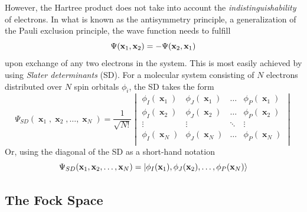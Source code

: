 However, the Hartree product does not take into account the \emph{indistinguishability} of electrons. In what is known as the antisymmetry principle, a generalization of the Pauli exclusion principle, the wave function needs to fulfill 
\begin{equation}
\Psi(\mathbf{x}_1,\mathbf{x}_2) = - \Psi(\mathbf{x}_2,\mathbf{x}_1) 
\end{equation}
\noindent upon exchange of any two electrons in the system. This is most easily achieved by using \emph{Slater determinants} (SD). For a molecular system consisting of $N$ electrons distributed over $N$ spin orbitals $\phi_i$, the SD takes the form
\begin{equation}
\Psi_{SD}(\mbfx_1, \mbfx_2, \ldots, \mbfx_N) = \frac{1}{\sqrt{N!}}
\begin{vmatrix}
\phi_I(\mbfx_1) & \phi_J(\mbfx_1) & \ldots & \phi_P(\mbfx_1) \\
\phi_I(\mbfx_2) & \phi_J(\mbfx_2) & \ldots & \phi_P(\mbfx_2) \\
\vdots & \vdots & \ddots & \vdots \\
\phi_I(\mbfx_N) & \phi_J(\mbfx_N) & \ldots & \phi_P(\mbfx_N) \\
\end{vmatrix}
\end{equation}
\noindent Or, using the diagonal of the SD as a short-hand notation
\begin{equation}
\Psi_{SD}(\mathbf{x}_1, \mathbf{x}_2, \ldots, \mathbf{x}_N) = \ket{\phi_I(\mathbf{x}_1) , \phi_J(\mathbf{x}_2), \ldots, \phi_P(\mathbf{x}_N)}
\end{equation}

\subsection{The Fock Space}

